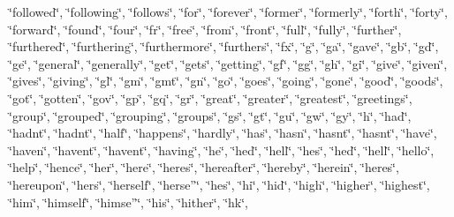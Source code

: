 \char`\"{}followed\char`\"{}, \char`\"{}following\char`\"{}, \char`\"{}follows\char`\"{}, \char`\"{}for\char`\"{}, \char`\"{}forever\char`\"{}, \char`\"{}former\char`\"{}, \char`\"{}formerly\char`\"{}, \char`\"{}forth\char`\"{}, \char`\"{}forty\char`\"{}, \char`\"{}forward\char`\"{}, \char`\"{}found\char`\"{}, \char`\"{}four\char`\"{}, \char`\"{}fr\char`\"{}, \char`\"{}free\char`\"{}, \char`\"{}from\char`\"{}, \char`\"{}front\char`\"{}, \char`\"{}full\char`\"{}, \char`\"{}fully\char`\"{}, \char`\"{}further\char`\"{}, \char`\"{}furthered\char`\"{}, \char`\"{}furthering\char`\"{}, \char`\"{}furthermore\char`\"{}, \char`\"{}furthers\char`\"{}, \char`\"{}fx\char`\"{}, \char`\"{}g\char`\"{}, \char`\"{}ga\char`\"{}, \char`\"{}gave\char`\"{}, \char`\"{}gb\char`\"{}, \char`\"{}gd\char`\"{}, \char`\"{}ge\char`\"{}, \char`\"{}general\char`\"{}, \char`\"{}generally\char`\"{}, \char`\"{}get\char`\"{}, \char`\"{}gets\char`\"{}, \char`\"{}getting\char`\"{}, \char`\"{}gf\char`\"{}, \char`\"{}gg\char`\"{}, \char`\"{}gh\char`\"{}, \char`\"{}gi\char`\"{}, \char`\"{}give\char`\"{}, \char`\"{}given\char`\"{}, \char`\"{}gives\char`\"{}, \char`\"{}giving\char`\"{}, \char`\"{}gl\char`\"{}, \char`\"{}gm\char`\"{}, \char`\"{}gmt\char`\"{}, \char`\"{}gn\char`\"{}, \char`\"{}go\char`\"{}, \char`\"{}goes\char`\"{}, \char`\"{}going\char`\"{}, \char`\"{}gone\char`\"{}, \char`\"{}good\char`\"{}, \char`\"{}goods\char`\"{}, \char`\"{}got\char`\"{}, \char`\"{}gotten\char`\"{}, \char`\"{}gov\char`\"{}, \char`\"{}gp\char`\"{}, \char`\"{}gq\char`\"{}, \char`\"{}gr\char`\"{}, \char`\"{}great\char`\"{}, \char`\"{}greater\char`\"{}, \char`\"{}greatest\char`\"{}, \char`\"{}greetings\char`\"{}, \char`\"{}group\char`\"{}, \char`\"{}grouped\char`\"{}, \char`\"{}grouping\char`\"{}, \char`\"{}groups\char`\"{}, \char`\"{}gs\char`\"{}, \char`\"{}gt\char`\"{}, \char`\"{}gu\char`\"{}, \char`\"{}gw\char`\"{}, \char`\"{}gy\char`\"{}, \char`\"{}h\char`\"{}, \char`\"{}had\char`\"{}, \char`\"{}hadn\textquotesingle{}t\char`\"{}, \char`\"{}hadnt\char`\"{}, \char`\"{}half\char`\"{}, \char`\"{}happens\char`\"{}, \char`\"{}hardly\char`\"{}, \char`\"{}has\char`\"{}, \char`\"{}hasn\char`\"{}, \char`\"{}hasn\textquotesingle{}t\char`\"{}, \char`\"{}hasnt\char`\"{}, \char`\"{}have\char`\"{}, \char`\"{}haven\char`\"{}, \char`\"{}haven\textquotesingle{}t\char`\"{}, \char`\"{}havent\char`\"{}, \char`\"{}having\char`\"{}, \char`\"{}he\char`\"{}, \char`\"{}he\textquotesingle{}d\char`\"{}, \char`\"{}he\textquotesingle{}ll\char`\"{}, \char`\"{}he\textquotesingle{}s\char`\"{}, \char`\"{}hed\char`\"{}, \char`\"{}hell\char`\"{}, \char`\"{}hello\char`\"{}, \char`\"{}help\char`\"{}, \char`\"{}hence\char`\"{}, \char`\"{}her\char`\"{}, \char`\"{}here\char`\"{}, \char`\"{}here\textquotesingle{}s\char`\"{}, \char`\"{}hereafter\char`\"{}, \char`\"{}hereby\char`\"{}, \char`\"{}herein\char`\"{}, \char`\"{}heres\char`\"{}, \char`\"{}hereupon\char`\"{}, \char`\"{}hers\char`\"{}, \char`\"{}herself\char`\"{}, \char`\"{}herse”\char`\"{}, \char`\"{}hes\char`\"{}, \char`\"{}hi\char`\"{}, \char`\"{}hid\char`\"{}, \char`\"{}high\char`\"{}, \char`\"{}higher\char`\"{}, \char`\"{}highest\char`\"{}, \char`\"{}him\char`\"{}, \char`\"{}himself\char`\"{}, \char`\"{}himse”\char`\"{}, \char`\"{}his\char`\"{}, \char`\"{}hither\char`\"{}, \char`\"{}hk\char`\"{}, 